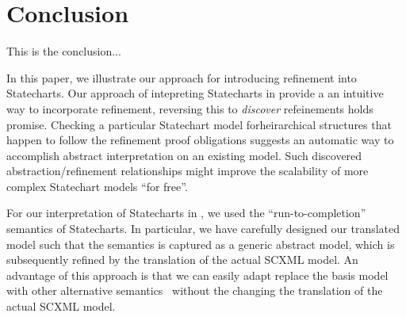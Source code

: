 
\section{Conclusion}
\label{sec:conclusion}

This is the conclusion...


In this paper, we illustrate our approach for introducing refinement into Statecharts.  Our approach of intepreting Statecharts in \iUMLB provide a an intuitive way to incorporate refinement, reversing this to \emph{discover} refeinements holds promise.  Checking a particular Statechart model forheirarchical structures that happen to follow the refinement proof obligations suggests an automatic way to accomplish abstract interpretation on an existing model.  Such discovered abstraction/refinement relationships might improve the scalability of more complex Statechart models ``for free''.

For our interpretation of Statecharts in \iUMLB, we used the ``run-to-completion'' semantics of Statecharts.  In particular, we have carefully designed our translated model such that the semantics is captured as a generic abstract model, which is subsequently refined by the translation of the actual SCXML model.  An advantage of this approach is that we can easily adapt replace the basis model with other alternative semantics~\cite{Eshuis_2009} without the changing the translation of the actual SCXML model. 

